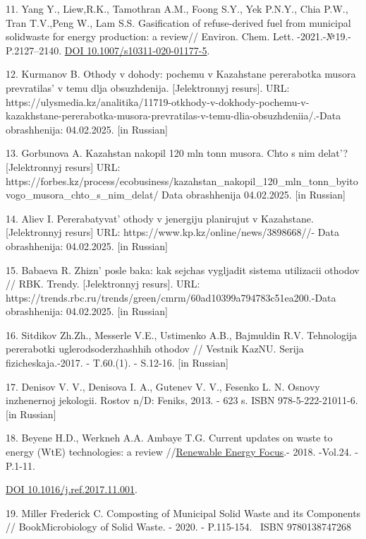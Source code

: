 11. Yang Y., Liew,R.K., Tamothran A.M., Foong S.Y., Yek P.N.Y., Chia
P.W., Tran T.V.,Peng W., Lam S.S. Gasification of refuse-derived fuel
from municipal solidwaste for energy production: a review// Environ.
Chem. Lett. -2021.-№19.- P.2127--2140.
\href{https://doi.org/10.1007/s10311-020-01177-5}{DOI
10.1007/s10311-020-01177-5}.

12. Kurmanov B. Othody v dohody: pochemu v Kazahstane pererabotka musora
prevratilas'{} v temu dlja obsuzhdenija. {[}Jelektronnyj
resurs{]}. URL:
https://ulysmedia.kz/analitika/11719-otkhody-v-dokhody-pochemu-v-kazakhstane-pererabotka-musora-prevratilas-v-temu-dlia-obsuzhdeniia/.-Data
obrashhenija: 04.02.2025. {[}in Russian{]}

13. Gorbunova A. Kazahstan nakopil 120 mln tonn musora. Chto s nim
delat'? {[}Jelektronnyj resurs{]} URL:
https://forbes.kz/process/ecobusiness/kazahstan\_nakopil\_120\_mln\_tonn\_byitovogo\_musora\_chto\_s\_nim\_delat/
Data obrashhenija 04.02.2025. {[}in Russian{]}

14. Aliev I. Pererabatyvat'{} othody v jenergiju
planirujut v Kazahstane. {[}Jelektronnyj resurs{]} URL:
https://www.kp.kz/online/news/3898668//- Data obrashhenija: 04.02.2025.
{[}in Russian{]}

15. Babaeva R. Zhizn'{} posle baka: kak sejchas vygljadit
sistema utilizacii othodov // RBK. Trendy. {[}Jelektronnyj resurs{]}.
URL:
https://trends.rbc.ru/trends/green/cmrm/60ad10399a794783c51ea200.-Data
obrashhenija: 04.02.2025. {[}in Russian{]}

16. Sitdikov Zh.Zh., Messerle V.E., Ustimenko A.B., Bajmuldin R.V.
Tehnologija pererabotki uglerodsoderzhashhih othodov // Vestnik KazNU.
Serija fizicheskaja.-2017. - T.60.(1). - S.12-16. {[}in Russian{]}

17. Denisov V. V., Denisova I. A., Gutenev V. V., Fesenko L. N. Osnovy
inzhenernoj jekologii. Rostov n/D: Feniks, 2013. - 623 s. ISBN
978-5-222-21011-6. {[}in Russian{]}

18. Beyene H.D., Werkneh A.A. Ambaye T.G. Current updates on waste to
energy (WtE) technologies: a review
//\href{https://www.sciencedirect.com/journal/renewable-energy-focus}{Renewable
Energy Focus}.- 2018. -Vol.24. -P.1-11.

\href{https://doi.org/10.1016/j.ref.2017.11.001}{DOI
10.1016/j.ref.2017.11.001}.

19. Miller Frederick C. Composting of Municipal Solid Waste and its
Components // BookMicrobiology of Solid Waste. - 2020. - P.115-154.
~ISBN 9780138747268

